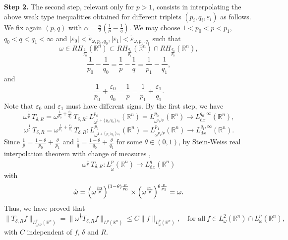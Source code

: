 \documentclass[12pt, letterpaper]{amsart}
\theoremstyle{definition}
\theoremstyle{remark}
\numberwithin{equation}{section}
\begin{document}
    \noindent\textbf{Step 2.} The second step, relevant only for $p > 1$, consists in interpolating the above weak type inequalities obtained for different triplets $(p_i, q_i, \varepsilon_i)$ as follows. We fix again $(p,q)$ with $\alpha=\frac{n}{2}(\frac{1}{p}-\frac{1}{q})$. We may choose $1<p_0<p<p_1$, $q_0<q<q_1<\infty$ and $|\varepsilon_0|<\tilde{\varepsilon}_{\omega, p_0,q_0}, |\varepsilon_1|<\tilde{\varepsilon}_{\omega, p_1,q_1}$  such that $$\omega \in RH_{\frac{{q}_1}{p_0}}(\mathbb{R}^n) \subset RH_{\frac{{q}_1}{p_1}}(\mathbb{R}^n) \cap RH_{\frac{{q}_0}{p_0}}(\mathbb{R}^n),$$ 
    $$ \frac{1}{p_0}-\frac{1}{q_0}=\frac{1}{p}-\frac{1}{q}=\frac{1}{p_1}-\frac{1}{q_1},$$
    and 
    $$ \frac{1}{p_0}+\frac{\varepsilon_0}{q_0}=\frac{1}{p} = \frac{1}{p_1}+\frac{\varepsilon_1}{{q}_1} .$$
    Note that $\varepsilon_0$ and $\varepsilon_1$ must have different signs. 
    By the first step, we have
    \begin{equation}\label{eq:weak1}
       \omega^{\frac 1 p}\, T_{\delta,R}= \omega^{\frac{1}{p_0}+\frac{\varepsilon_0}{{q}_0}} \, T_{\delta,R}:  
       L^{p_0}_{\omega^{1+(p_0/{q}_0)\varepsilon_0 }}(\mathbb{R}^n)=L^{p_0}_{\omega^{p_0/p }}(\mathbb{R}^n)  \longrightarrow L^{q_0,\infty}_{\mathrm{d}x}(\mathbb{R}^n),
    \end{equation}
    \begin{equation}\label{eq:weak2}
       \omega^{\frac 1 p}\, T_{\delta,R}=\omega^{\frac{1}{p_1}+\frac{\varepsilon_1}{{q}_1}} \, T_{\delta,R}:   
       L^{p_1}_{\omega^{1+(p_1/{q}_1)\varepsilon_1 }}(\mathbb{R}^n)=L^{p_1}_{\omega^{p_1/p }}(\mathbb{R}^n) \longrightarrow L^{q_1,\infty}_{\mathrm{d}x}(\mathbb{R}^n).
    \end{equation}
    Since ${\frac{1}{p}=\frac{1-\theta}{p_0}+\frac{\theta}{p_1}}$ and ${\frac{1}{q}=\frac{1-\theta}{q_0}+\frac{\theta}{q_1}} $ for some $\theta \in (0,1)$, 
    by Stein-Weiss real interpolation theorem with change of measures \cite[Theorem 2.9]{stein1958interpolation}, 
    $$\omega^{\frac 1 p}\, T_{\delta,R}:   L^{p}_{\tilde\omega}(\mathbb{R}^n) \longrightarrow L^{q}_{\mathrm{d}x}(\mathbb{R}^n)$$
    with 
    $$\Tilde{\omega}= \left ( \omega^{\frac{p_0}p} \right )^{(1-\theta)\frac{p}{p_0}} \times \left ( \omega^{\frac{p_1}p} \right )^{\theta \frac{p}{p_1}}=\omega. $$
     Thus, we have proved that
    \begin{equation}\label{eq:TepsR}
         \| T_{\delta,R}f\|_{L^{q}_{\omega^{q/p}}(\mathbb{R}^n)} = \| \omega^{\frac 1 p}T_{\delta,R}f\|_{L^{q}(\mathbb{R}^n)}\leq C  \|f \|_{L^p_\omega(\mathbb{R}^n)}, \quad \text{for all} \ f \in  L^2_\omega(\mathbb{R}^n)\cap L^p_\omega(\mathbb{R}^n),
    \end{equation}
    with $C$ independent of $f$, $\delta$ and $R$.
    
\end{document}
